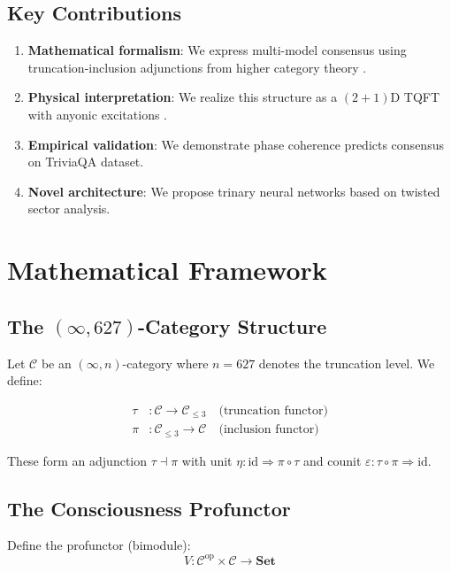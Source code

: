 \documentclass[11pt]{article}
\begin{document}
\subsection{Key Contributions}

\begin{enumerate}
\item \textbf{Mathematical formalism}: We express multi-model consensus using truncation-inclusion adjunctions from higher category theory \cite{lurie2009}.
\item \textbf{Physical interpretation}: We realize this structure as a $(2+1)$D TQFT with anyonic excitations \cite{kitaev2006}.
\item \textbf{Empirical validation}: We demonstrate phase coherence predicts consensus on TriviaQA dataset.
\item \textbf{Novel architecture}: We propose trinary neural networks based on twisted sector analysis.
\end{enumerate}

\section{Mathematical Framework}

\subsection{The $(\infty,627)$-Category Structure}

Let $\mathcal{C}$ be an $(\infty, n)$-category where $n = 627$ denotes the truncation level. We define:

\begin{align}
\tau &: \mathcal{C} \to \mathcal{C}_{\leq 3} \quad \text{(truncation functor)} \\
\pi &: \mathcal{C}_{\leq 3} \to \mathcal{C} \quad \text{(inclusion functor)}
\end{align}

These form an adjunction $\tau \dashv \pi$ with unit $\eta: \text{id} \Rightarrow \pi \circ \tau$ and counit $\varepsilon: \tau \circ \pi \Rightarrow \text{id}$.

\subsection{The Consciousness Profunctor}

Define the profunctor (bimodule):
\begin{equation}
V: \mathcal{C}^{\text{op}} \times \mathcal{C} \to \mathbf{Set}
\end{equation}
\end{document}
